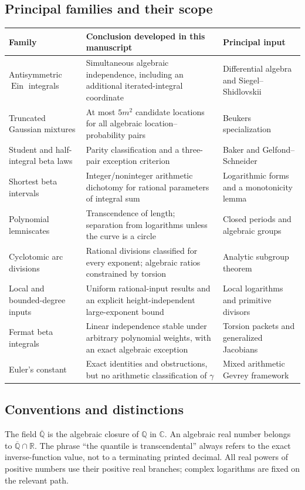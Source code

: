 \documentclass[11pt,a4paper]{article}
\numberwithin{equation}{section}
\theoremstyle{definition}
\theoremstyle{remark}
\newcommand{\Q}{\mathbb Q}
\newcommand{\Qb}{\overline{\mathbb Q}}
\newcommand{\R}{\mathbb R}
\newcommand{\C}{\mathbb C}
\newcommand{\Ein}{\operatorname{Ein}}
\begin{document}
\subsection{Principal families and their scope}
\begin{longtable}{@{}P{0.25\textwidth}P{0.47\textwidth}P{0.22\textwidth}@{}}
\toprule
Family & Conclusion developed in this manuscript & Principal input\\
\midrule
\endhead
Antisymmetric $\Ein$ integrals & Simultaneous algebraic independence, including
an additional iterated-integral coordinate & Differential algebra and
Siegel--Shidlovskii\\
Truncated Gaussian mixtures & At most $5m^2$ candidate locations for all
algebraic location--probability pairs & Beukers specialization\\
Student and half-integral beta laws & Parity classification and a three-pair
exception criterion & Baker and Gelfond--Schneider\\
Shortest beta intervals & Integer/noninteger arithmetic dichotomy for rational
parameters of integral sum & Logarithmic forms and a monotonicity lemma\\
Polynomial lemniscates & Transcendence of length; separation from logarithms
unless the curve is a circle & Closed periods and algebraic groups\\
Cyclotomic arc divisions & Rational divisions classified for every exponent;
algebraic ratios constrained by torsion & Analytic subgroup theorem\\
Local and bounded-degree inputs & Uniform rational-input results and an
explicit height-independent large-exponent bound & Local logarithms and
primitive divisors\\
Fermat beta integrals & Linear independence stable under arbitrary polynomial
weights, with an exact algebraic exception & Torsion packets and generalized
Jacobians\\
Euler's constant & Exact identities and obstructions, but no arithmetic
classification of $\gamma$ & Mixed arithmetic Gevrey framework\\
\bottomrule
\end{longtable}

\subsection{Conventions and distinctions}
The field $\Qb$ is the algebraic closure of $\Q$ in $\C$. An algebraic real
number belongs to $\Qb\cap\R$. The phrase ``the quantile is transcendental''
always refers to the exact inverse-function value, not to a terminating
printed decimal. All real powers of positive numbers use their positive
real branches; complex logarithms are fixed on the relevant path.
\end{document}

